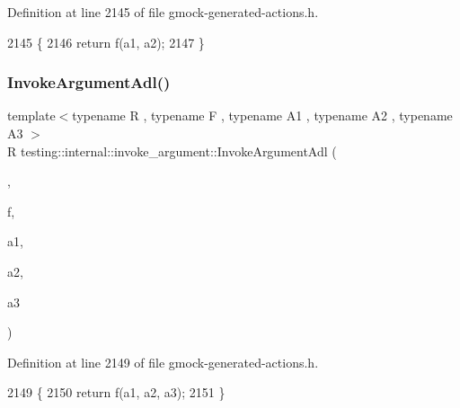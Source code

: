 Definition at line 2145 of file gmock-\/generated-\/actions.\+h.


\begin{DoxyCode}
2145                                                \{
2146   \textcolor{keywordflow}{return} f(a1, a2);
2147 \}
\end{DoxyCode}
\mbox{\label{namespacetesting_1_1internal_1_1invoke__argument_ae5e7bcffcae6a29e9c66298ead5ee91b}} 
\subsubsection{\texorpdfstring{Invoke\+Argument\+Adl()}{InvokeArgumentAdl()}\hspace{0.1cm}{\footnotesize\ttfamily [4/11]}}
{\footnotesize\ttfamily template$<$typename R , typename F , typename A1 , typename A2 , typename A3 $>$ \\
R testing\+::internal\+::invoke\+\_\+argument\+::\+Invoke\+Argument\+Adl (\begin{DoxyParamCaption}\item[{\hyperlink{structtesting_1_1internal_1_1invoke__argument_1_1AdlTag}{Adl\+Tag}}]{,  }\item[{F}]{f,  }\item[{A1}]{a1,  }\item[{A2}]{a2,  }\item[{A3}]{a3 }\end{DoxyParamCaption})}



Definition at line 2149 of file gmock-\/generated-\/actions.\+h.


\begin{DoxyCode}
2149                                                       \{
2150   \textcolor{keywordflow}{return} f(a1, a2, a3);
2151 \}
\end{DoxyCode}
\mbox{\label{namespacetesting_1_1internal_1_1invoke__argument_aace931066a0efe189d7a0c69f06b74ec}} 
